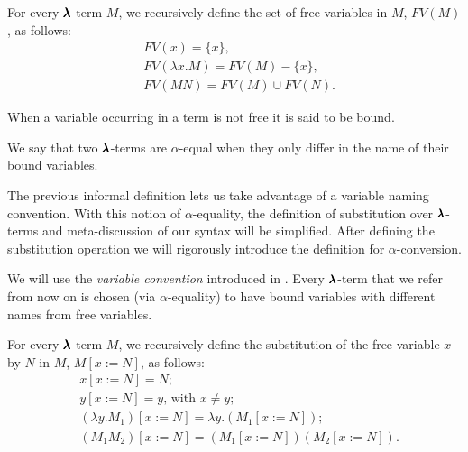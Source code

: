 \begin{definition}
  For every $\pmb{\lambda}$-term $M$, we recursively define the set of free variables in $M$, $FV(M)$, as follows:  
  \begin{align*}
    & FV( x ) = \{ x \}, \\
    & FV( \lambda x . M ) = FV(M) - \{ x \}, \\
    & FV( M N ) = FV(M) \cup FV(N).
  \end{align*}

  When a variable occurring in a term is not free it is said to be bound.
\end{definition}


\begin{definition}
  We say that two $\pmb{\lambda}$-terms are $\alpha$-equal when they only differ in the name of their bound variables.
\end{definition}

\begin{remark}
  The previous informal definition lets us take advantage of a variable naming convention.
  With this notion of $\alpha$-equality, the definition of substitution over $\pmb{\lambda}$-terms and meta-discussion of our syntax will be simplified.
  After defining the substitution operation we will rigorously introduce the definition for $\alpha$-conversion.
\end{remark}

\begin{convention} 
  We will use the \textit{variable convention} introduced in \cite{Barendregt1987}.
  Every $\pmb{\lambda}$-term that we refer from now on is chosen (via $\alpha$-equality) to have bound variables with different names from free variables.
\end{convention}

\begin{definition}[Substitution]
  For every $\pmb{\lambda}$-term $M$, we recursively define the substitution of the free variable $x$ by $N$ in $M$, $M[x := N]$, as follows:
  \begin{align*}
    & x[x := N] = N; \\
    & y[x := N] = y \text{, with } x \neq y; \\
    & (\lambda y . M_1)[x := N] = \lambda y . (M_1[x := N]); \\
    & (M_1 M_2)[x := N] = (M_1[x := N]) (M_2[x := N]).
  \end{align*}
\end{definition}

